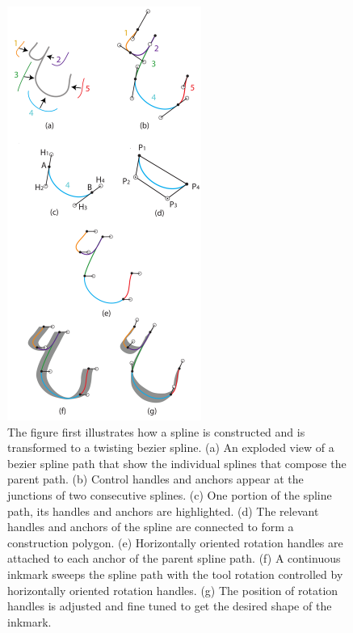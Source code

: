         \begin{figure}[!t]
            \centering
            \includegraphics[width=2.5in]{../Images/BezierSplineCurve.pdf}
            \caption{The figure first illustrates how a spline is constructed and is transformed to a twisting bezier spline. (a) An exploded view of a bezier spline path that show the individual splines that compose the parent path. (b) Control handles and anchors appear at the junctions of two consecutive splines. (c) One portion of the spline path, its handles and anchors are highlighted. (d) The relevant handles and anchors of the spline are connected to form a construction polygon. (e) Horizontally oriented rotation handles are attached to each anchor of the parent spline path. (f) A continuous inkmark sweeps the spline path with the tool rotation controlled by horizontally oriented rotation handles. (g) The position of rotation handles is adjusted and fine tuned to get the desired shape of the inkmark. }
            \label{Fig:BezierSplines}
        \end{figure}


